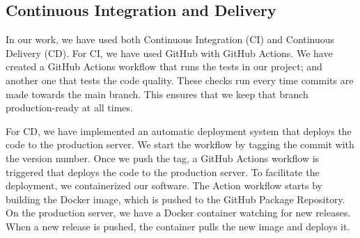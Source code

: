 \subsection{Continuous Integration and Delivery}
In our work, we have used both Continuous Integration (CI) and Continuous Delivery (CD).
For CI, we have used GitHub with GitHub Actions. We have created a GitHub Actions workflow that
runs the tests in our project; and another one that tests the code quality. These checks run every time commits are made towards the main branch. This ensures that we keep that branch production-ready
at all times.

For CD, we have implemented an automatic deployment system that deploys the code to the production server.
We start the workflow by tagging the commit with the version number. Once we push the tag, a GitHub Actions
workflow is triggered that deploys the code to the production server.
To facilitate the deployment, we containerized our software. The Action workflow starts by building the
Docker image, which is pushed to the GitHub Package Repository. On the production server, we have a Docker 
container watching for new releases. When a new release is pushed, the container pulls the new image and
deploys it.
